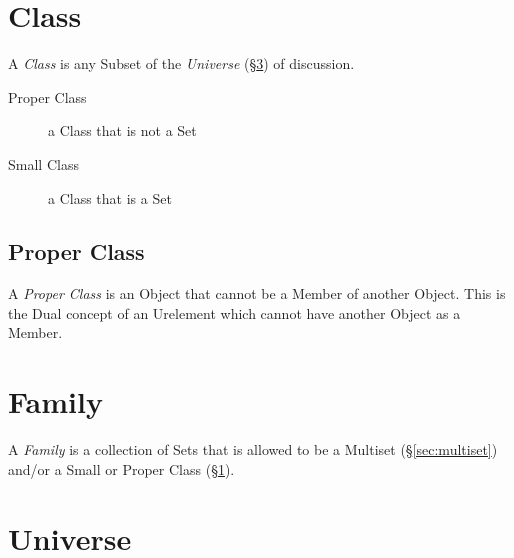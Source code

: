 \section{Class}\label{sec:class}

A \emph{Class} is any Subset of the \emph{Universe}
(\S\ref{sec:universe}) of discussion.

\begin{description}
  \item [Proper Class] a Class that is not a Set
  \item [Small Class] a Class that is a Set
\end{description}



\subsection{Proper Class}\label{sec:proper_class}

A \emph{Proper Class} is an Object that cannot be a Member of another
Object. This is the Dual concept of an Urelement which cannot have
another Object as a Member.



\section{Family}\label{sec:family}

A \emph{Family} is a collection of Sets that is allowed to be a
Multiset (\S\ref{sec:multiset}) and/or a Small or Proper Class
(\S\ref{sec:class}).



\section{Universe}\label{sec:universe}

